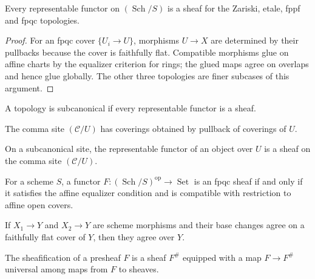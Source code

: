 \begin{theorem}\label{fga-thm-2-55}
Every representable functor on $(\operatorname{Sch}/S)$ is a sheaf for the
Zariski, etale, fppf and fpqc topologies.
\end{theorem}
\begin{proof}
For an fpqc cover $\{U_i\to U\}$, morphisms $U\to X$ are determined by their
pullbacks because the cover is faithfully flat.  Compatible morphisms glue on
affine charts by the equalizer criterion for rings; the glued maps agree on
overlaps and hence glue globally.  The other three topologies are finer
subcases of this argument.
\end{proof}

\begin{definition}\label{fga-def-2-57}
A topology is subcanonical if every representable functor is a sheaf.
\end{definition}
\begin{definition}\label{fga-def-2-58}
The comma site $(\mathcal C/U)$ has coverings obtained by pullback of coverings
of $U$.
\end{definition}
\begin{proposition}\label{fga-prop-2-59}
On a subcanonical site, the representable functor of an object over $U$ is a
sheaf on the comma site $(\mathcal C/U)$.
\end{proposition}
\begin{lemma}\label{fga-lem-2-60}
For a scheme $S$, a functor $F:(\operatorname{Sch}/S)^{\mathrm{op}}\to\operatorname{Set}$
is an fpqc sheaf if and only if it satisfies the affine equalizer condition and
is compatible with restriction to affine open covers.
\end{lemma}
\begin{lemma}\label{fga-lem-2-62}
If $X_1\to Y$ and $X_2\to Y$ are scheme morphisms and their base changes agree
on a faithfully flat cover of $Y$, then they agree over $Y$.
\end{lemma}
\begin{definition}[sheafification]\label{fga-def-2-63}
The sheafification of a presheaf $F$ is a sheaf $F^\#$ equipped with a map
$F\to F^\#$ universal among maps from $F$ to sheaves.
\end{definition}
